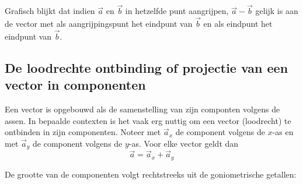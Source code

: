 \documentclass{ximera}
\begin{document}
\begin{image}[!]
\end{image}

Grafisch blijkt dat indien \(\vec{a}\) en \(\vec{b}\) in hetzelfde punt aangrijpen, \(\vec{a} - \vec{b}\) gelijk is aan de vector met als aangrijpingspunt het eindpunt van \(\vec{b}\) en als eindpunt het eindpunt van \(\vec{b}\).



\subsection*{De loodrechte ontbinding of projectie van een vector in componenten}



Een vector is opgebouwd als de samenstelling van zijn componten volgens de assen.  
In bepaalde contexten is het vaak erg nuttig om een vector (loodrecht) te ontbinden in zijn componenten. 
Noteer met \(\vec{a}_x\) de component volgens de \(x\)-as en met \(\vec{a}_y\) de component volgens de \(y\)-as. 
Voor elke vector geldt dan 
\[
\vec{a} = \vec{a}_x + \vec{a}_y
\]

De grootte van de componenten volgt rechtstreeks uit de goniometrische getallen: 
\end{document}
